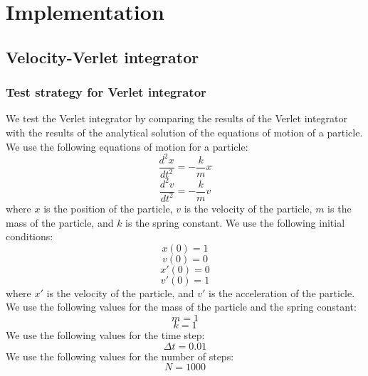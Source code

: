 \chapter{Implementation}\label{chap:Implementation}

\section{Velocity-Verlet integrator}
\subsection{Test strategy for Verlet integrator}
We test the Verlet integrator by comparing the results of the Verlet integrator with the results of the analytical solution of the equations of motion of a particle. We use the following equations of motion for a particle:
\begin{equation}
    \frac{d^2 x}{dt^2} = -\frac{k}{m}x
\end{equation}
\begin{equation}
    \frac{d^2 v}{dt^2} = -\frac{k}{m}v
\end{equation}
where $x$ is the position of the particle, $v$ is the velocity of the particle, $m$ is the mass of the particle, and $k$ is the spring constant. We use the following initial conditions:
\begin{equation}
    x(0) = 1
\end{equation}
\begin{equation}
    v(0) = 0
\end{equation}
\begin{equation}
    x'(0) = 0
\end{equation}
\begin{equation}
    v'(0) = 1
\end{equation}
where $x'$ is the velocity of the particle, and $v'$ is the acceleration of the particle. We use the following values for the mass of the particle and the spring constant: 
\begin{equation}
    m = 1
\end{equation}
\begin{equation}
    k = 1
\end{equation}
We use the following values for the time step:
\begin{equation}
    \Delta t = 0.01
\end{equation}
We use the following values for the number of steps:
\begin{equation}
    N = 1000
\end{equation}
